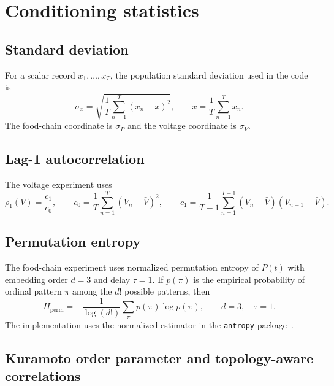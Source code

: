 \documentclass[10pt,a4paper]{article}
\begin{document}
\section{Conditioning statistics}

\subsection{Standard deviation}

For a scalar record $x_1,\ldots,x_T$, the population standard deviation used in
the code is
\begin{equation}
  \sigma_x=\sqrt{\frac{1}{T}\sum_{n=1}^{T}(x_n-\bar{x})^2},
  \qquad
  \bar{x}=\frac{1}{T}\sum_{n=1}^{T}x_n.
  \label{eq:std}
\end{equation}
The food-chain coordinate is $\sigma_P$ and the voltage coordinate is
$\sigma_V$.

\subsection{Lag-1 autocorrelation}

The voltage experiment uses
\begin{equation}
  \rho_1(V)=\frac{c_1}{c_0},\qquad
  c_0=\frac{1}{T}\sum_{n=1}^{T}(V_n-\bar V)^2,
  \qquad
  c_1=\frac{1}{T-1}\sum_{n=1}^{T-1}(V_n-\bar V)(V_{n+1}-\bar V).
  \label{eq:ac1}
\end{equation}

\subsection{Permutation entropy}

The food-chain experiment uses normalized permutation entropy of $P(t)$ with
embedding order $d=3$ and delay $\tau=1$. If $p(\pi)$ is the empirical
probability of ordinal pattern $\pi$ among the $d!$ possible patterns, then
\begin{equation}
  H_{\mathrm{perm}}
  =-\frac{1}{\log(d!)}\sum_{\pi}p(\pi)\log p(\pi),
  \qquad d=3,\quad \tau=1.
  \label{eq:permentropy}
\end{equation}
The implementation uses the normalized estimator in the \texttt{antropy}
package~\cite{Bandt2002}.

\subsection{Kuramoto order parameter and topology-aware correlations}
\end{document}
